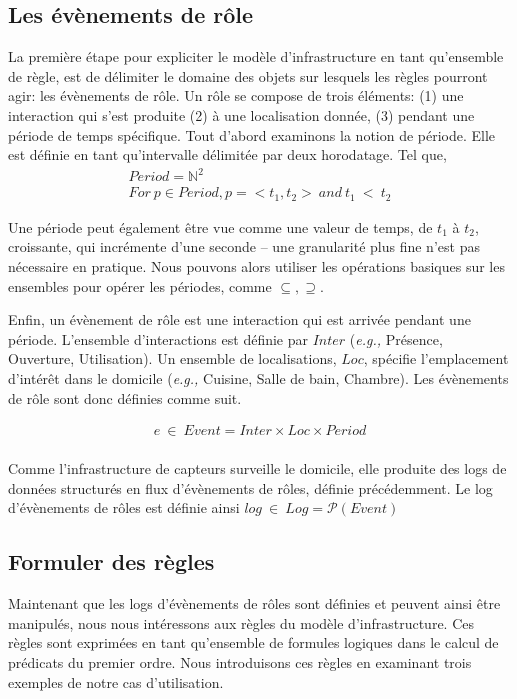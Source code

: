 \subsection{Les évènements de rôle}\label{archi:algebra} 
La première étape pour expliciter le modèle d'infrastructure en tant qu'ensemble de règle, est de délimiter le domaine des objets sur lesquels les règles pourront agir: les évènements de rôle. Un rôle se compose de trois éléments: (1) une interaction qui s'est produite (2) à une localisation donnée, (3) pendant une période de temps spécifique. Tout d'abord examinons la notion de période. Elle est définie en tant qu'intervalle délimitée par deux horodatage. Tel que, \begin{displaymath}\label{archi:algebra:period1}
 \begin{array}{c} 
  Period = \mathds{N}^2\\
    For~p \in Period, p = <t_1, t_2>~and~t_1~<~t_2
 \end{array}
\end{displaymath}

Une période peut également être vue comme une valeur de temps, de $t_1$ à $t_2$, croissante, qui incrémente d'une seconde -- une granularité plus fine n'est pas nécessaire en pratique. Nous pouvons alors utiliser les opérations basiques sur les ensembles pour opérer les périodes, comme $\subseteq, \supseteq$.

Enfin, un évènement de rôle est une interaction qui est arrivée pendant une période. L'ensemble d'interactions est définie par $Inter$ ({\em e.g.,} Présence, Ouverture, Utilisation). Un ensemble de localisations, $Loc$, spécifie l'emplacement d'intérêt dans le domicile ({\em e.g.,} Cuisine, Salle de bain, Chambre). Les évènements de rôle sont donc définies comme suit.

\begin{displaymath}\label{archi:algebra:event}
  \begin{array}{c}
    e~\in~Event = Inter \times Loc \times Period \\
  \end{array}
\end{displaymath}

Comme l'infrastructure de capteurs surveille le domicile, elle produite des logs de données structurés en flux d'évènements de rôles, définie précédemment. Le log d'évènements de rôles est définie ainsi $log~\in~Log = \mathscr{P}(Event)$

\subsection{Formuler des règles}
Maintenant que les logs d'évènements de rôles sont définies et peuvent ainsi être manipulés, nous nous intéressons aux règles du modèle d'infrastructure. Ces règles sont exprimées en tant qu'ensemble de formules logiques dans le calcul de prédicats du premier ordre. Nous introduisons ces règles en examinant trois exemples de notre cas d'utilisation.

